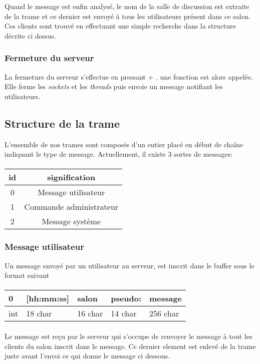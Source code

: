 \documentclass[a4paper, 12pt]{article}
\newcommand{\Touche}[1]{\Ovalbox{#1}}
\begin{document}
Quand le message est enfin analysé, le nom de la salle de discussion est extraite de la trame et ce dernier est envoyé à tous les utilisateurs présent dans ce salon. Ces clients sont trouvé en effectuant une simple recherche dans la structure décrite ci dessus.

\subsubsection{Fermeture du serveur}
La fermeture du serveur s'effectue en pressant \Touche{Ctrl} + \Touche{C}. une fonction est alors appelée. Elle ferme les \emph{sockets} et les \emph{threads} puis envoie un message notifiant les utilisateurs.

\subsection{Structure de la trame}
L'ensemble de nos trames sont composés d'un entier placé en début de chaîne indiquant le type de message.
Actuellement, il existe 3 sortes de messages:
\paragraph{}
\begin{tabular}{|c|c|}
 \hline			
   id & signification \\
 \hline		
   0 & Message utilisateur \\
 \hline
   1 & Commande administrateur \\
 \hline
   2 & Message système \\
 \hline
 \end{tabular}
\subsubsection{Message utilisateur}
Un message envoyé par un utilisateur au serveur, est inscrit dans le buffer sous le format suivant
\paragraph{}
\begin{tabular}{|p{0.5cm}|p{2cm}|p{1.6cm}|p{1.5cm}|p{5cm}| }
 \hline			
  0 & [hh:mm:ss] & salon & pseudo: & message \\
 \hline		
  int & 18 char & 16 char & 14 char & 256 char \\
 \hline  
 \end{tabular}
 \paragraph{}
Le message est reçu par le serveur qui s'occupe de renvoyer le message à tout les clients du salon inscrit dans le message.
Ce dernier element est enlevé de la trame juste avant l'envoi ce qui donne le message ci dessous.
\end{document}
